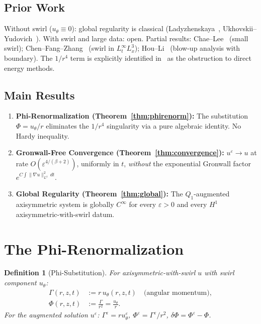 \documentclass[11pt]{article}
\newtheorem{definition}[theorem]{Definition}
\newcommand{\eps}{\varepsilon}
\begin{document}
\subsection{Prior Work}

Without swirl ($u_\theta\equiv 0$): global regularity is classical
(Ladyzhenskaya~\cite{Lady1968}, Ukhovskii--Yudovich~\cite{UY1968}).
With swirl and large data: open.
Partial results: Chae--Lee~\cite{ChaeLee2000} (small swirl);
Chen--Fang--Zhang~\cite{CFZ2018} (swirl in $L^\infty_tL^3_x$);
Hou--Li~\cite{HouLi2006} (blow-up analysis with boundary).
The $1/r^4$ term is explicitly identified in~\cite{Danchin2007}
as the obstruction to direct energy methods.

\subsection{Main Results}

\begin{enumerate}[label=(\Roman*)]
\item \textbf{Phi-Renormalization (Theorem~\ref{thm:phirenorm}):}
The substitution $\Phi = u_\theta/r$ eliminates the $1/r^4$
singularity via a pure algebraic identity. No Hardy inequality.

\item \textbf{Gronwall-Free Convergence (Theorem~\ref{thm:convergence}):}
$u^\eps\to u$ at rate $O(\eps^{4/(\beta+2)})$, uniformly in $t$,
\emph{without} the exponential Gronwall factor
$e^{C\int\|\nabla u\|_{L^4}^2\,dt}$.

\item \textbf{Global Regularity (Theorem~\ref{thm:global}):}
The $Q_1$-augmented axisymmetric system is globally $C^\infty$
for every $\eps>0$ and every $H^1$ axisymmetric-with-swirl datum.
\end{enumerate}

\section{The Phi-Renormalization}
\label{sec:phirenorm}

\begin{definition}[Phi-Substitution]\label{def:phi}
For axisymmetric-with-swirl $u$ with swirl component $u_\theta$:
\begin{align*}
  \Gamma(r,z,t) &:= r\,u_\theta(r,z,t) \quad \text{(angular momentum)},\\
  \Phi(r,z,t) &:= \frac{\Gamma}{r^2} = \frac{u_\theta}{r}.
\end{align*}
For the augmented solution $u^\eps$: $\Gamma^\eps=ru^\eps_\theta$,
$\Phi^\eps=\Gamma^\eps/r^2$, $\delta\Phi=\Phi^\eps-\Phi$.
\end{definition}
\end{document}
